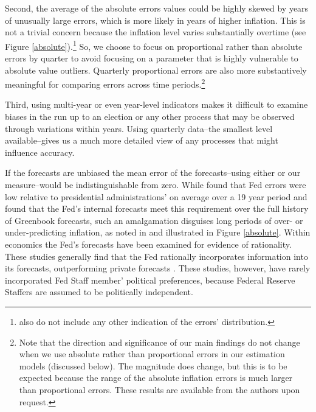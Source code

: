 \documentclass[a4paper]{article}
\begin{document}
Second, the average of the absolute errors values could be highly skewed by years of unusually large errors, which is more likely in years of higher inflation. This is not a trivial concern because the inflation level varies substantially overtime (see Figure \ref{absolute}).\footnote{\cite{Frendreis2000} also do not include any other indication of the errors' distribution.} So, we choose to focus on proportional rather than absolute errors by quarter to avoid focusing on a parameter that is highly vulnerable to absolute value outliers. Quarterly proportional errors are also more substantively meaningful for comparing errors across time periods.\footnote{Note that the direction and significance of our main findings do not change when we use absolute rather than proportional errors in our estimation models (discussed below). The magnitude does change, but this is to be expected because the range of the absolute inflation errors is much larger than proportional errors. These results are available from the authors upon request.} 

Third, using multi-year or even year-level indicators makes it difficult to examine biases in the run up to an election or any other process that may be observed through variations within years. Using quarterly data--the smallest level available--gives us a much more detailed view of any processes that might influence accuracy.

If the forecasts are unbiased the mean error of the forecasts--using either \cite{Frendreis2000} or our measure--would be indistinguishable from zero. While \cite{Frendreis2000} found that Fed errors were low relative to presidential administrations' on average over a 19 year period and \cite{Romer2000} found that the Fed's internal forecasts  meet this requirement over the full history of Greenbook forecasts, such an amalgamation disguises long periods of over- or under-predicting inflation, as noted in \cite{Capistran2006} and illustrated in Figure \ref{absolute}. Within economics the Fed's forecasts have been examined for evidence of rationality. These studies generally find that the Fed rationally incorporates information into its forecasts, outperforming private forecasts \cite[c.f.][]{Gamber2009}. These studies, however, have rarely incorporated Fed Staff member' political preferences, because Federal Reserve Staffers are assumed to be politically independent.
\end{document}
